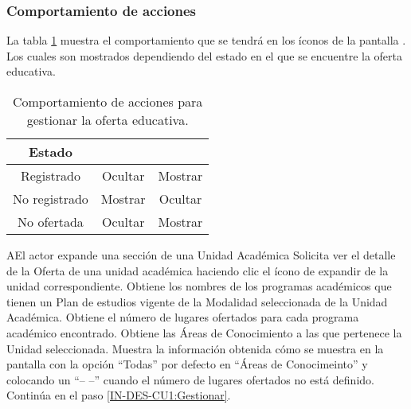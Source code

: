 \subsubsection{Comportamiento de acciones}

La tabla \ref{TablaComportamiento-IN-DES-CU1} muestra el comportamiento que se tendrá en los íconos de la pantalla . Los cuales son mostrados dependiendo del estado en el que se encuentre la oferta educativa.

\begin{table}[htbp]
	\begin{center}
		\begin{tabular}{|c|c|c|}
			\hline
			Estado & \IUbutton{Registrar Oferta Educativa} & \IUEditar \\
			\hline \hline
			Registrado & Ocultar & Mostrar \\ \hline
			No registrado & Mostrar & Ocultar \\ \hline
			No ofertada & Ocultar & Mostrar \\ \hline
		\end{tabular}
		\caption{Comportamiento de acciones para gestionar la oferta educativa.}
		\label{TablaComportamiento-IN-DES-CU1}
	\end{center}
\end{table}

\begin{UCtrayectoriaA}{A}{El actor expande una sección de una Unidad Académica}
	\UCpaso [\UCactor] Solicita ver el detalle de la Oferta de una unidad académica haciendo clic el ícono de expandir de la unidad correspondiente.
	\UCpaso Obtiene los nombres de los programas académicos que tienen un Plan de estudios vigente de la Modalidad seleccionada de la Unidad Académica.
	\UCpaso Obtiene el número de lugares ofertados para cada programa académico encontrado.
	\UCpaso Obtiene las Áreas de Conocimiento a las que pertenece la Unidad seleccionada.
	\UCpaso Muestra la información obtenida cómo se muestra en la pantalla  con la opción ``Todas'' por defecto en ``Áreas de Conocimeinto'' y colocando un ``-- --'' cuando el número de lugares ofertados no está definido.
	\UCpaso[] Continúa en el paso \ref{IN-DES-CU1:Gestionar}.
\end{UCtrayectoriaA}

